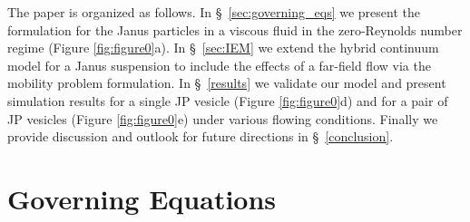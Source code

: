 \documentclass[lineno]{jfm}
\begin{document}
The paper is organized as follows. In \S~\ref{sec:governing_eqs} we
present the formulation for the Janus particles in a viscous fluid in
the zero-Reynolds number regime (Figure \ref{fig:figure0}a). In
\S~\ref{sec:IEM} we extend the hybrid continuum model for a Janus
suspension to include the effects of a far-field flow via the mobility
problem formulation. In \S~\ref{results} we validate our model and
present simulation results for a single JP vesicle (Figure
\ref{fig:figure0}d) and for a pair of JP vesicles (Figure
\ref{fig:figure0}e) under various flowing conditions. Finally we provide
discussion and outlook for future directions in \S~\ref{conclusion}.



\section{Governing Equations\label{sec:governing_eqs}}
\end{document}
